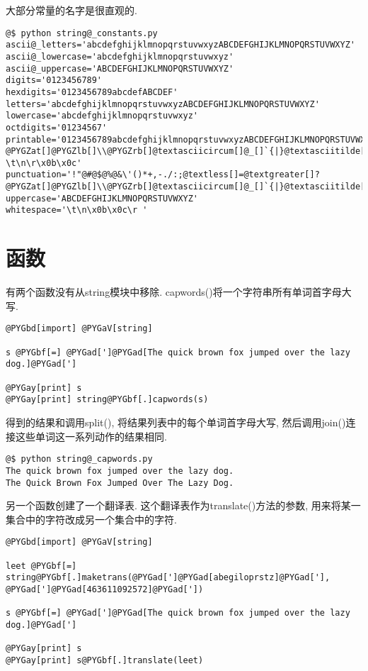\documentclass[a4paper,10pt,english]{manual}
\begin{document}
大部分常量的名字是很直观的.

\begin{Verbatim}[commandchars=@\[\]]
@$ python string@_constants.py
ascii@_letters='abcdefghijklmnopqrstuvwxyzABCDEFGHIJKLMNOPQRSTUVWXYZ'
ascii@_lowercase='abcdefghijklmnopqrstuvwxyz'
ascii@_uppercase='ABCDEFGHIJKLMNOPQRSTUVWXYZ'
digits='0123456789'
hexdigits='0123456789abcdefABCDEF'
letters='abcdefghijklmnopqrstuvwxyzABCDEFGHIJKLMNOPQRSTUVWXYZ'
lowercase='abcdefghijklmnopqrstuvwxyz'
octdigits='01234567'
printable='0123456789abcdefghijklmnopqrstuvwxyzABCDEFGHIJKLMNOPQRSTUVWXYZ!"@#@$@%@&\'()*+,-./:;@textless[]=@textgreater[]?@PYGZat[]@PYGZlb[]\\@PYGZrb[]@textasciicircum[]@_[]`{|}@textasciitilde[] \t\n\r\x0b\x0c'
punctuation='!"@#@$@%@&\'()*+,-./:;@textless[]=@textgreater[]?@PYGZat[]@PYGZlb[]\\@PYGZrb[]@textasciicircum[]@_[]`{|}@textasciitilde[]'
uppercase='ABCDEFGHIJKLMNOPQRSTUVWXYZ'
whitespace='\t\n\x0b\x0c\r '
\end{Verbatim}


\section{函数}

有两个函数没有从string模块中移除. capwords()将一个字符串所有单词首字母大写.

\begin{Verbatim}[commandchars=@\[\]]
@PYGbd[import] @PYGaV[string]

s @PYGbf[=] @PYGad[']@PYGad[The quick brown fox jumped over the lazy dog.]@PYGad[']

@PYGay[print] s
@PYGay[print] string@PYGbf[.]capwords(s)
\end{Verbatim}

得到的结果和调用split(), 将结果列表中的每个单词首字母大写, 然后调用join()连接这些单词这一系列动作的结果相同.

\begin{Verbatim}[commandchars=@\[\]]
@$ python string@_capwords.py
The quick brown fox jumped over the lazy dog.
The Quick Brown Fox Jumped Over The Lazy Dog.
\end{Verbatim}

另一个函数创建了一个翻译表. 这个翻译表作为translate()方法的参数, 用来将某一集合中的字符改成另一个集合中的字符.

\begin{Verbatim}[commandchars=@\[\]]
@PYGbd[import] @PYGaV[string]

leet @PYGbf[=] string@PYGbf[.]maketrans(@PYGad[']@PYGad[abegiloprstz]@PYGad['], @PYGad[']@PYGad[463611092572]@PYGad['])

s @PYGbf[=] @PYGad[']@PYGad[The quick brown fox jumped over the lazy dog.]@PYGad[']

@PYGay[print] s
@PYGay[print] s@PYGbf[.]translate(leet)
\end{Verbatim}
\end{document}
